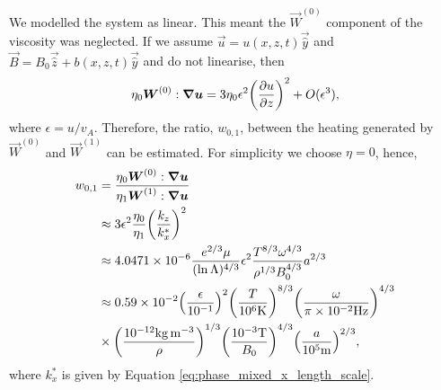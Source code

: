 We modelled the system as linear. This meant the $\vec{W}^{(0)}$ component of the viscosity was neglected. If we assume $\vec{u}=u(x,z,t)\vec{\hat{y}}$ and $\vec{B}=B_0\vec{\hat{z}} + b(x,z,t)\vec{\hat{y}}$ and do not linearise, then
\begin{equation}
    \eta_0\boldsymbol{W}^{(0)}:\grad{\boldsymbol{u}} = 3\eta_0\epsilon^2\qty(\pdv{u}{z})^2 + O(\epsilon^3),
\end{equation}
where $\epsilon=u/v_A$.
Therefore, the ratio, $w_{0,1}$, between the heating generated by $\vec{W}^{(0)}$ and $\vec{W}^{(1)}$ can be estimated. For simplicity we choose $\eta=0$, hence,
\begin{equation}
\label{eq:w01}
\begin{aligned}
    w_{0,1} &= \frac{\eta_0\vec{W}^{(0)}:\grad{\vec{u}}}{\eta_1\vec{W}^{(1)}:\grad{\vec{u}}} \\
    &\approx 3\epsilon^2\frac{\eta_0}{\eta_1}\qty(\frac{k_z}{k_x^*})^2 \\
    &\approx 4.0471\times10^{-6}\frac{e^{2/3}\mu}{(\ln\Lambda)^{4/3}}\epsilon^2\frac{T^{8/3}\omega^{4/3}}{\rho^{1/3}B_0^{4/3}}a^{2/3} \\
    &\approx 0.59\times10^{-2}\qty(\frac{\epsilon}{10^{-1}})^2\qty(\frac{T}{10^{6}\si{.K}})^{8/3}\qty(\frac{\omega}{\pi\times10^{-2}\si{.Hz}})^{4/3}\\
    &\times\qty(\frac{10^{-12}\si{.kg.m^{-3}}}{\rho})^{1/3}\qty(\frac{10^{-3}\si{.T}}{B_0})^{4/3}\qty(\frac{a}{10^5\si{.m}})^{2/3},
\end{aligned}
\end{equation}
where $k_x^*$ is given by Equation \eqref{eq:phase_mixed_x_length_scale}.

